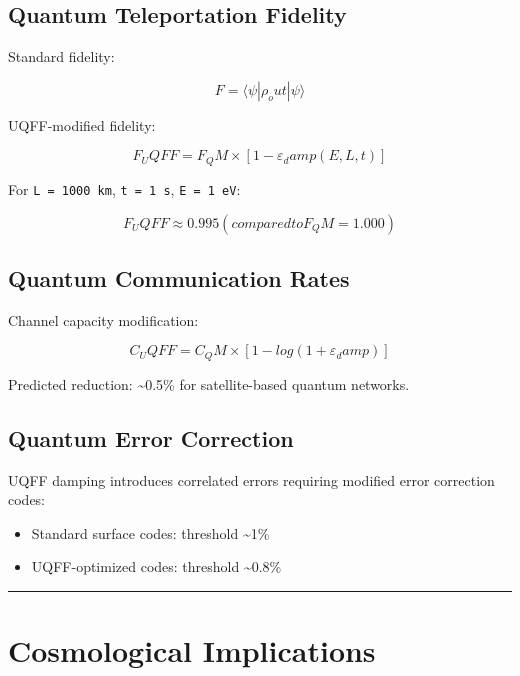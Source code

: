 \documentclass[12pt,a4paper]{article}
\begin{document}
\subsection{Quantum Teleportation Fidelity}

Standard fidelity:

\begin{equation}
F = ⟨\psi|\rho_out|\psi⟩
\end{equation}

UQFF-modified fidelity:

\begin{equation}
F_UQFF = F_QM \times [1 - \varepsilon_damp(E,L,t)]
\end{equation}

For \texttt{L = 1000 km}, \texttt{t = 1 s}, \texttt{E = 1 eV}:

\begin{equation}
F_UQFF \approx 0.995 (compared to F_QM = 1.000)
\end{equation}

\subsection{Quantum Communication Rates}

Channel capacity modification:

\begin{equation}
C_UQFF = C_QM \times [1 - log(1 + \varepsilon_damp)]
\end{equation}

Predicted reduction: \textasciitilde{}0.5\% for satellite-based quantum networks.

\subsection{Quantum Error Correction}

UQFF damping introduces correlated errors requiring modified error correction codes:

\begin{itemize}
  \item Standard surface codes: threshold \textasciitilde{}1\%
  \item UQFF-optimized codes: threshold \textasciitilde{}0.8\%
\end{itemize}

\medskip\hrule\medskip

\section{Cosmological Implications}
\end{document}
